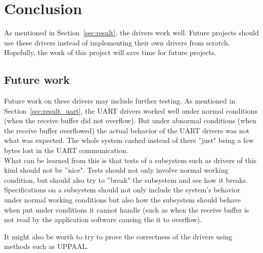 
\section{Conclusion}\label{sec:conclusion}
As mentioned in Section~\ref{sec:result}, the drivers work well. Future projects should use these drivers instead of implementing their own drivers from scratch. Hopefully, the work of this project will save time for future projects.

\subsection{Future work}
Future work on these drivers may include further testing. As mentioned in Section~\ref{sec:result_uart}, the UART drivers worked well under normal conditions (when the receive buffer did not overflow). But under abnormal conditions (when the receive buffer overflowed) the actual behavior of the UART drivers was not what was expected. The whole system cashed instead of there ''just" being a few bytes lost in the UART communication. \\
What can be learned from this is that tests of a subsystem such as drivers of this kind should not be ''nice". Tests should not only involve normal working condition, but should also try to ''break" the subsystem and see how it breaks. Specifications on a subsystem should not only include the system's behavior under normal working conditions but also how the subsystem should behave when put under conditions it cannot handle (such as when the receive buffer is not read by the application software causing the it to overflow).

It might also be worth to try to prove the correctness of the drivers using methods such as UPPAAL.